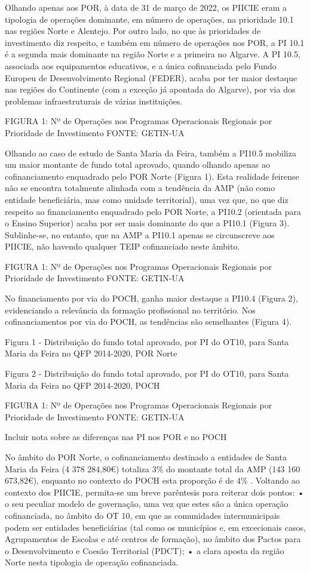 \documentclass[
]{book}
\theoremstyle{definition}
\theoremstyle{definition}
\theoremstyle{definition}
\theoremstyle{definition}
\theoremstyle{remark}
\begin{document}
Olhando apenas aos POR, à data de 31 de março de 2022, os PIICIE eram a tipologia de operações dominante, em número de operações, na prioridade 10.1 nas regiões Norte e Alentejo. Por outro lado, no que às prioridades de investimento diz respeito, e também em número de operações nos POR, a PI 10.1 é a segunda mais dominante na região Norte e a primeira no Algarve. A PI 10.5, associada aos equipamentos educativos, e a única cofinanciada pelo Fundo Europeu de Desenvolvimento Regional (FEDER), acaba por ter maior destaque nas regiões do Continente (com a exceção já apontada do Algarve), por via dos problemas infraestruturais de várias instituições.

FIGURA 1: Nº de Operações nos Programas Operacionais Regionais por Prioridade de Investimento
FONTE: GETIN-UA

Olhando ao caso de estudo de Santa Maria da Feira, também a PI10.5 mobiliza um maior montante de fundo total aprovado, quando olhando apenas ao cofinanciamento enquadrado pelo POR Norte (Figura 1). Esta realidade feirense não se encontra totalmente alinhada com a tendência da AMP (não como entidade beneficiária, mas como unidade territorial), uma vez que, no que diz respeito ao financiamento enquadrado pelo POR Norte, a PI10.2 (orientada para o Ensino Superior) acaba por ser mais dominante do que a PI10.1 (Figura 3). Sublinhe-se, no entanto, que na AMP a PI10.1 apenas se circunscreve aos PIICIE, não havendo qualquer TEIP cofinanciado neste âmbito.

FIGURA 1: Nº de Operações nos Programas Operacionais Regionais por Prioridade de Investimento
FONTE: GETIN-UA

No financiamento por via do POCH, ganha maior destaque a PI10.4 (Figura 2), evidenciando a relevância da formação profissional no território. Nos cofinanciamentos por via do POCH, as tendências são semelhantes (Figura 4).

Figura 1 - Distribuição do fundo total aprovado, por PI do OT10, para Santa Maria da Feira no QFP 2014-2020, POR Norte

Figura 2 - Distribuição do fundo total aprovado, por PI do OT10, para Santa Maria da Feira no QFP 2014-2020, POCH

FIGURA 1: Nº de Operações nos Programas Operacionais Regionais por Prioridade de Investimento
FONTE: GETIN-UA

Incluir nota sobre as diferenças nas PI nos POR e no POCH

No âmbito do POR Norte, o cofinanciamento destinado a entidades de Santa Maria da Feira (4 378 284,80€) totaliza 3\% do montante total da AMP (143 160 673,82€), enquanto no contexto do POCH esta proporção é de 4\% .
Voltando ao contexto dos PIICIE, permita-se um breve parêntesis para reiterar dois pontos:
• o seu peculiar modelo de governação, uma vez que estes são a única operação cofinanciada, no âmbito do OT 10, em que as comunidades intermunicipais podem ser entidades beneficiárias (tal como os municípios e, em excecionais casos, Agrupamentos de Escolas e até centros de formação), no âmbito dos Pactos para o Desenvolvimento e Coesão Territorial (PDCT);
• a clara aposta da região Norte nesta tipologia de operação cofinanciada.
\end{document}
